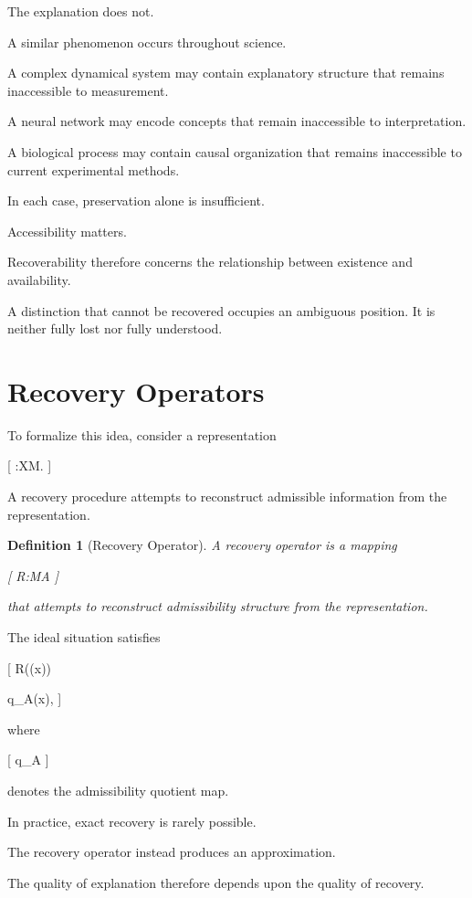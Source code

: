 \documentclass[11pt,oneside,openany]{book}
\newtheorem{definition}{Definition}[chapter] \newtheorem{theorem}{Theorem}[chapter] \newtheorem{proposition}{Proposition}[chapter] \newtheorem{lemma}{Lemma}[chapter] \newtheorem{corollary}{Corollary}[chapter] \newtheorem{remark}{Remark}[chapter]
\begin{document}
The explanation does not.

A similar phenomenon occurs throughout science.

A complex dynamical system may contain explanatory structure that remains inaccessible to measurement.

A neural network may encode concepts that remain inaccessible to interpretation.

A biological process may contain causal organization that remains inaccessible to current experimental methods.

In each case, preservation alone is insufficient.

Accessibility matters.

Recoverability therefore concerns the relationship between existence and availability.

A distinction that cannot be recovered occupies an ambiguous position. It is neither fully lost nor fully understood.

\section{Recovery Operators}

To formalize this idea, consider a representation

[
\pi:\mathcal X\rightarrow\mathcal M.
]

A recovery procedure attempts to reconstruct admissible information from the representation.

\begin{definition}[Recovery Operator]

A recovery operator is a mapping

[
R:\mathcal M\rightarrow\mathcal A
]

that attempts to reconstruct admissibility structure from the representation.

\end{definition}

The ideal situation satisfies

[
R(\pi(x))

q_A(x),
]

where

[
q_A
]

denotes the admissibility quotient map.

In practice, exact recovery is rarely possible.

The recovery operator instead produces an approximation.

The quality of explanation therefore depends upon the quality of recovery.
\end{document}
